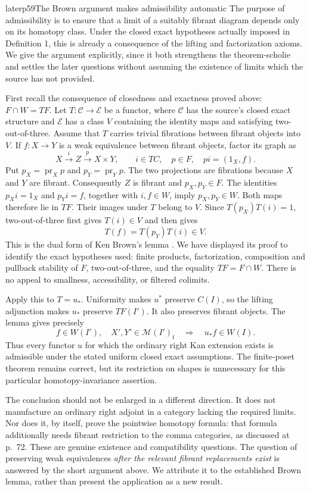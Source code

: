 \begin{dcomment}{later}{p59}{The Brown argument makes admissibility automatic}
The purpose of admissibility is to ensure that a limit of a suitably fibrant diagram depends only on its homotopy class. Under the closed exact hypotheses actually imposed in Definition 1, this is already a consequence of the lifting and factorization axioms. We give the argument explicitly, since it both strengthens the theorem-scholie and settles the later questions without assuming the existence of limits which the source has not provided.

First recall the consequence of closedness and exactness proved above: $F\cap W=TF$. Let $T:\mathcal C\to\mathcal E$ be a functor, where $\mathcal C$ has the source's closed exact structure and $\mathcal E$ has a class $V$ containing the identity maps and satisfying two-out-of-three. Assume that $T$ carries trivial fibrations between fibrant objects into $V$. If $f:X\to Y$ is a weak equivalence between fibrant objects, factor its graph as
\[
 X\xrightarrow{i} Z\xrightarrow{p}X\times Y,
 \qquad i\in TC,\quad p\in F,\quad pi=(1_X,f).
\]
Put $p_X=\operatorname{pr}_Xp$ and $p_Y=\operatorname{pr}_Yp$. The two projections are fibrations because $X$ and $Y$ are fibrant. Consequently $Z$ is fibrant and $p_X,p_Y\in F$. The identities $p_Xi=1_X$ and $p_Yi=f$, together with $i,f\in W$, imply $p_X,p_Y\in W$. Both maps therefore lie in $TF$. Their images under $T$ belong to $V$. Since $T(p_X)T(i)=1$, two-out-of-three first gives $T(i)\in V$ and then gives
\[
                         T(f)=T(p_Y)T(i)\in V.
\]
This is the dual form of Ken Brown's lemma \citep[Lemma 1.1.12]{Hovey1999}. We have displayed its proof to identify the exact hypotheses used: finite products, factorization, composition and pullback stability of $F$, two-out-of-three, and the equality $TF=F\cap W$. There is no appeal to smallness, accessibility, or filtered colimits.

Apply this to $T=u_*$. Uniformity makes $u^*$ preserve $C(I)$, so the lifting adjunction makes $u_*$ preserve $TF(I')$. It also preserves fibrant objects. The lemma gives precisely
\[
 f\in W(I'),\quad X',Y'\in\mathcal M(I')_{\mathrm f}
 \quad\Longrightarrow\quad u_*f\in W(I).
\]
Thus every functor $u$ for which the ordinary right Kan extension exists is admissible under the stated uniform closed exact assumptions. The finite-poset theorem remains correct, but its restriction on shapes is unnecessary for this particular homotopy-invariance assertion.

The conclusion should not be enlarged in a different direction. It does not manufacture an ordinary right adjoint in a category lacking the required limits. Nor does it, by itself, prove the pointwise homotopy formula: that formula additionally needs fibrant restriction to the comma categories, as discussed at p.~72. These are genuine existence and compatibility questions. The question of preserving weak equivalences \emph{after the relevant fibrant replacements exist} is answered by the short argument above. We attribute it to the established Brown lemma, rather than present the application as a new result.
\end{dcomment}


